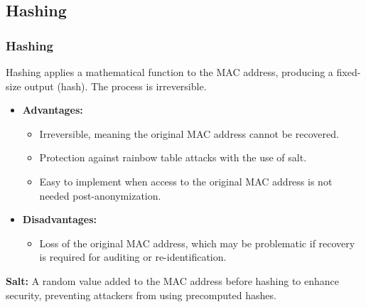 \documentclass[
	11pt, %
]{beamer}
\begin{document}
\begin{frame}
  \section{Hashing}
  \frametitle{Hashing}
  Hashing applies a mathematical function to the MAC address, producing a fixed-size output (hash). The process is irreversible.
  \begin{itemize}
    \item \textbf{Advantages:} \pause
      \begin{itemize}
        \item Irreversible, meaning the original MAC address cannot be recovered. \pause
        \item Protection against rainbow table attacks with the use of salt. \pause
        \item Easy to implement when access to the original MAC address is not needed post-anonymization. \pause
      \end{itemize}
    \item \textbf{Disadvantages:} \pause
      \begin{itemize}
        \item Loss of the original MAC address, which may be problematic if recovery is required for auditing or re-identification. \pause
      \end{itemize}
  \end{itemize}
  \textbf{Salt:} A random value added to the MAC address before hashing to enhance security, preventing attackers from using precomputed hashes.
\end{frame}
\end{document}
